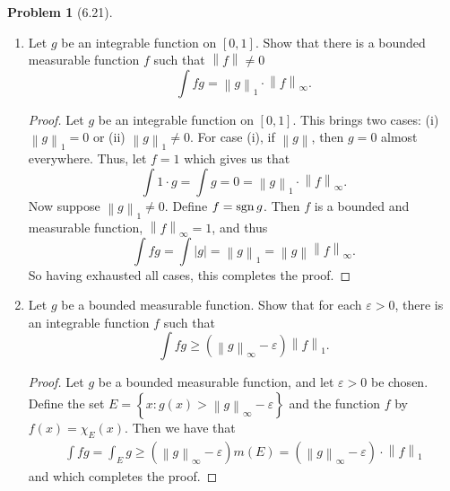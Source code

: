 \documentclass[12pt]{article}
\def\sgn{\mathop{\rm sgn}\nolimits}
\renewcommand{\epsilon}{\varepsilon}
\newcommand{\norm}[1]{\left\lVert #1 \right\rVert}
\newcommand{\abs}[1]{\left\lvert #1 \right\rvert}
\theoremstyle{definition}
\newtheorem{problem}{Problem}
\begin{document}
\begin{problem}[6.21]

    \begin{enumerate}[label = (\alph{*})]
        \item Let \( g \) be an integrable function on \( [0,1] \). Show that there is a bounded measurable function \( f \) such that \( \norm{f} \neq 0 \) 
            \[
                \int fg = \norm{g}_{1} \cdot \norm{f}_{\infty}.  
            \]

                \begin{proof}
                    Let \( g \) be an integrable function on \( [0,1] \). This brings two cases: (i) \( \norm{g}_1 = 0 \) or (ii) \( \norm{g}_1 \neq 0 \). 
                    For case (i), if \( \norm{g}\), then \( g = 0 \) almost everywhere. Thus, let \( f = 1 \) which gives us that 
                        \[
                            \int 1 \cdot g = \int g = 0 = \norm{g}_1 \cdot \norm{f}_{\infty} . 
                        \]
                    Now suppose \( \norm{g}_1 \neq 0 \). Define \( f = \sgn{g} \). Then \( f \) is a bounded and measurable function, \( \norm{f}_{\infty} = 1 \), and thus
                        \[
                            \int fg = \int \abs{g} =  \norm{g}_{1} = \norm{g} \norm{f}_{\infty} .
                        \]
                    So having exhausted all cases, this completes the proof. 
                \end{proof}
        \item Let \( g \) be a bounded measurable function. Show that for each \( \epsilon > 0 \), there is an integrable function \( f \) such that 
            \[
                \int fg \geq \left( \norm{g}_{\infty} - \epsilon \right) \norm{f}_{1}. 
            \]
                \begin{proof}
                    Let \( g \) be a bounded measurable function, and let \( \epsilon > 0 \) be chosen. 
                    Define the set \( E = \left\{  x: g(x) > \norm{g}_{\infty} - \epsilon \right\}\) and the function \( f \) by \( f(x) = \chi_{E}(x) \). 
                    Then we have that
                        \begin{align*}
                            \int fg = \int_{E} g \geq \left(\norm{g}_{\infty} - \epsilon \right) m(E) = \left(\norm{g}_{\infty} - \epsilon \right) \cdot \norm{f}_{1}
                        \end{align*}
                    and which completes the proof. 
                \end{proof}
    \end{enumerate}


\end{problem}
\end{document}
